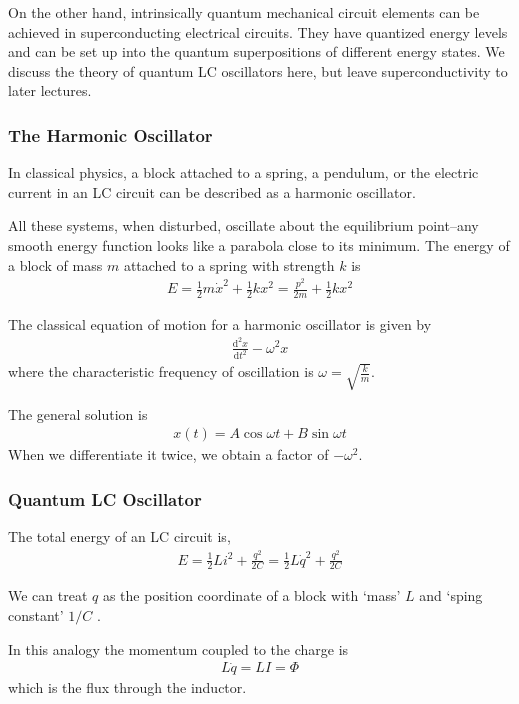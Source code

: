On the other hand, intrinsically quantum mechanical circuit elements can be achieved in superconducting electrical circuits. They have quantized energy levels and can be set up into the quantum superpositions of different energy states. We discuss the theory of quantum LC oscillators here, but leave superconductivity to later lectures.

\subsubsection{The Harmonic Oscillator}
In classical physics, a block attached to a spring, a pendulum, or the electric current in an LC circuit can be described as a harmonic oscillator.

All these systems, when disturbed, oscillate about the equilibrium point–any smooth energy function looks like a parabola close to its minimum. The energy of a block of mass $m$ attached to a spring with strength $k$ is
\begin{align*}
    E=\frac{1}{2}m\dot{x}^2+\frac{1}{2}kx^2=\frac{p^2}{2m}+\frac{1}{2}kx^2
\end{align*}

The classical equation of motion for a harmonic oscillator is given by
\begin{align*}
    \frac{\mathrm{d}^2 x}{\mathrm{d}t^2}-\omega^2x
\end{align*}
where the characteristic frequency of oscillation is $\omega=\sqrt{\frac{k}{m}}$. 

The general solution is 
\begin{align*}
    x(t)=A\cos\omega t+B\sin\omega t
\end{align*}
When we differentiate it twice, we obtain a factor of $-\omega^2$. 

\subsubsection{Quantum LC Oscillator}
The total energy of an LC circuit is,
\begin{align*}
    E=\frac{1}{2}Li^2+\frac{q^2}{2C}=\frac{1}{2}L\dot{q}^2+\frac{q^2}{2C}
\end{align*}

We can treat $q$ as the position coordinate of a block with `mass' $L$ and `sping constant' $1/C$ .

In this analogy the momentum coupled to the charge is
\begin{align*}
    L\dot{q}=LI=\Phi
\end{align*}
which is the flux through the inductor. 


